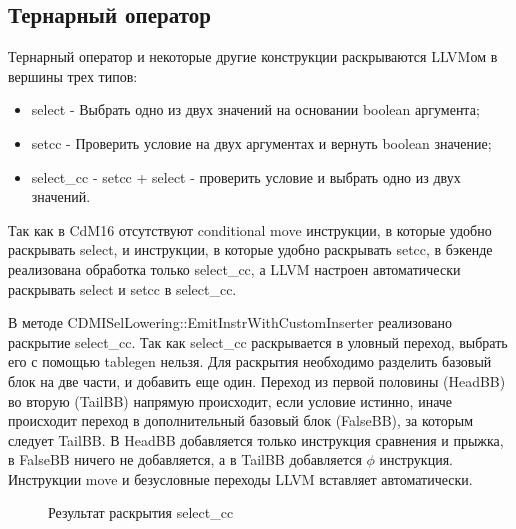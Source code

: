 \documentclass[a4paper,14pt]{extarticle}
\begin{document}
\subsection{Тернарный оператор}

Тернарный оператор и некоторые другие конструкции раскрываются LLVMом в вершины трех типов:
\begin{itemize}
	\item select - Выбрать одно из двух значений на основании boolean аргумента;
	\item setcc - Проверить условие на двух аргументах и вернуть boolean значение;
	\item select\_cc - setcc + select - проверить условие и выбрать одно из двух значений.
\end{itemize}

Так как в CdM16 отсутствуют conditional move инструкции, в которые удобно раскрывать select, и инструкции, в которые удобно раскрывать setcc, в бэкенде реализована обработка только select\_cc, а LLVM настроен автоматически раскрывать select и setcc в select\_cc. 

В методе CDMISelLowering::EmitInstrWithCustomInserter реализовано раскрытие select\_cc. Так как select\_cc раскрывается в уловный переход, выбрать его с помощью tablegen нельзя. Для раскрытия необходимо разделить базовый блок на две части, и добавить еще один. Переход из первой половины (HeadBB) во вторую (TailBB) напрямую происходит, если условие истинно, иначе происходит переход в дополнительный базовый блок (FalseBB), за которым следует TailBB. В HeadBB добавляется только инструкция сравнения и прыжка, в FalseBB ничего не добавляется, а в TailBB добавляется  $\phi$ инструкция. Инструкции move и безусловные переходы LLVM вставляет автоматически.

\begin{figure}[h!]
	\begin{center}
		\caption{Результат раскрытия select\_cc}
	\end{center}
\end{figure}
\end{document}

